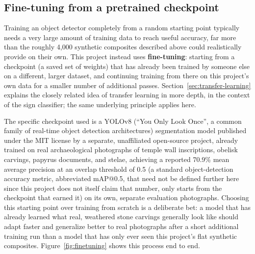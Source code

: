 \documentclass[11pt,a4paper]{report}
\begin{document}
\subsection{Fine-tuning from a pretrained checkpoint}
\label{sec:detector-finetuning}

Training an object detector completely from a random starting point
typically needs a very large amount of training data to reach useful
accuracy, far more than the roughly 4{,}000 synthetic composites described
above could realistically provide on their own. This project instead uses
\textbf{fine-tuning}: starting from a checkpoint (a saved set of weights)
that has already been trained by someone else on a different, larger
dataset, and continuing training from there on this project's own data for
a smaller number of additional passes. Section~\ref{sec:transfer-learning}
explains the closely related idea of transfer learning in more depth, in
the context of the sign classifier; the same underlying principle applies
here.

The specific checkpoint used is a YOLOv8 (``You Only Look Once'', a common
family of real-time object detection architectures) segmentation model
published under the MIT license by a separate, unaffiliated open-source
project, already trained on real archaeological photographs of temple wall
inscriptions, obelisk carvings, papyrus documents, and stelae, achieving a
reported 70.9\% mean average precision at an overlap threshold of 0.5 (a
standard object-detection accuracy metric, abbreviated mAP@0.5, that need
not be defined further here since this project does not itself claim that
number, only starts from the checkpoint that earned it) on its own,
separate evaluation photographs. Choosing this starting point over training
from scratch is a deliberate bet: a model that has already learned what
real, weathered stone carvings generally look like should adapt faster and
generalize better to real photographs after a short additional training run
than a model that has only ever seen this project's flat synthetic
composites. Figure~\ref{fig:finetuning} shows this process end to end.
\end{document}
